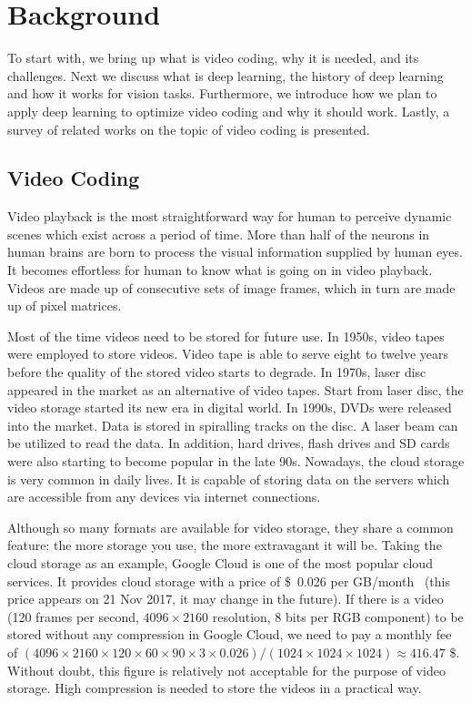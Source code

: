 \chapter{Background}\label{ch:chapter2} %
%
%
To start with, we bring up what is video coding, why it is needed, and
its challenges.
Next we discuss what is deep learning, the history of deep learning and how
it works for vision tasks.
Furthermore, we introduce how we plan to apply deep learning to optimize video
coding and why it should work.
Lastly, a survey of related works on the topic of video coding is presented.

\section{Video Coding}\label{sec:video-coding}
Video playback is the most straightforward way for human to perceive dynamic
scenes which exist across a period of time.
More than half of the neurons in human brains are born to process the visual
information supplied by human eyes.
It becomes effortless for human to know what is going on in
video playback.
Videos are made up of consecutive sets of image frames, which in turn
are made up of pixel matrices.

Most of the time videos need to be stored for future use.
In 1950s, video tapes were employed to store videos.
Video tape is able to serve eight to twelve years
before the quality of the stored video starts to degrade.
In 1970s, laser disc appeared in the market as an alternative of video tapes.
Start from laser disc, the video storage started its new era in digital world.
In 1990s, DVDs were released into the market.
Data is stored in spiralling tracks on the disc.
A laser beam can be utilized to read the data.
In addition, hard drives, flash drives and SD cards were also starting to
become popular in the late 90s.
Nowadays, the cloud storage is very common in daily lives.
It is capable of storing data on the servers which are
accessible from any devices via internet connections.

Although so many formats are available for video storage, they share a common
feature: the more storage you use, the more extravagant it will be.
Taking the cloud storage as an example,
Google Cloud is one of the most popular cloud services.
It provides cloud storage with a price
of \SI{0.026}[\$]{} per GB/month~\parencite{RN202}
(this price appears on 21 Nov 2017, it may change in the future).
If there is a video 
(120 frames per second, 
\(4096\times2160\) resolution, 
8 bits per RGB component)
to be stored without
any compression in Google Cloud,
we need to pay a monthly fee of
\((4096\times2160\times120\times60\times90\times3\times0.026)/(1024\times1024\times1024) \approx 416.47\) \$.
Without doubt, this figure is relatively not acceptable for the purpose of
video storage.
High compression is needed to store the videos in a practical way.

